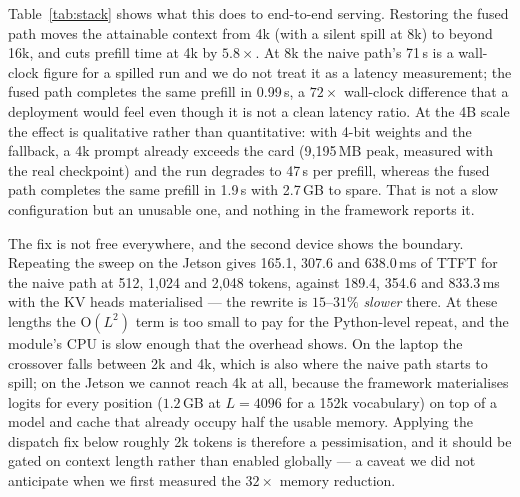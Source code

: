 \documentclass[5p]{elsarticle}
\begin{document}
Table~\ref{tab:stack} shows what this does to end-to-end serving. Restoring the
fused path moves the attainable context from 4k (with a silent spill at 8k) to
beyond 16k, and cuts prefill time at 4k by $5.8\times$. At 8k the naive path's
71\,s is a wall-clock figure for a spilled run and we do not treat it as a
latency measurement; the fused path completes the same prefill in 0.99\,s, a
$72\times$ wall-clock difference that a deployment would feel even though it is
not a clean latency ratio. At the 4B scale the effect is qualitative rather than
quantitative: with 4-bit weights and the fallback, a 4k prompt already exceeds
the card (9{,}195\,MB peak, measured with the real checkpoint) and the run
degrades to 47\,s per prefill, whereas the fused path completes the same prefill
in 1.9\,s with 2.7\,GB to spare. That
is not a slow configuration but an unusable one, and nothing in the framework
reports it.

The fix is not free everywhere, and the second device shows the boundary.
Repeating the sweep on the Jetson gives 165.1, 307.6 and 638.0\,ms of TTFT for
the naive path at 512, 1{,}024 and 2{,}048 tokens, against 189.4, 354.6 and
833.3\,ms with the KV heads materialised --- the rewrite is $15$--$31\%$
\emph{slower} there. At these lengths the $\mathrm{O}(L^2)$ term is too small to
pay for the Python-level repeat, and the module's CPU is slow enough that the
overhead shows. On the laptop the crossover falls between 2k and 4k, which is
also where the naive path starts to spill; on the Jetson we cannot reach 4k at
all, because the framework materialises logits for every position ($1.2$\,GB at
$L{=}4096$ for a 152k vocabulary) on top of a model and cache that already
occupy half the usable memory. Applying the dispatch fix below roughly 2k tokens
is therefore a pessimisation, and it should be gated on context length rather
than enabled globally --- a caveat we did not anticipate when we first measured
the $32\times$ memory reduction.
\end{document}
